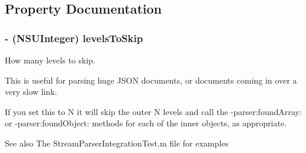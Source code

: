 \subsection{\-Property \-Documentation}
\hypertarget{interface_s_b_json_stream_parser_adapter_a1b7451c67d9149b14632c228909659bb}{
\subsubsection[{levels\-To\-Skip}]{\setlength{\rightskip}{0pt plus 5cm}-\/ (\-N\-S\-U\-Integer) levels\-To\-Skip}}
\label{interface_s_b_json_stream_parser_adapter_a1b7451c67d9149b14632c228909659bb}


\-How many levels to skip. 

\-This is useful for parsing huge \-J\-S\-O\-N documents, or documents coming in over a very slow link.

\-If you set this to \-N it will skip the outer \-N levels and call the -\/parser\-:found\-Array\-: or -\/parser\-:found\-Object\-: methods for each of the inner objects, as appropriate.

\begin{DoxySeeAlso}{\-See also}
\-The \-Stream\-Parser\-Integration\-Test.\-m file for examples 
\end{DoxySeeAlso}


